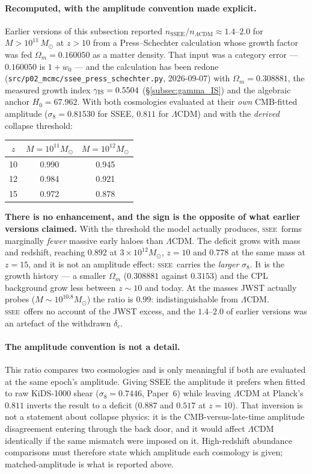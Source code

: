 \documentclass[12pt,a4paper]{article}
\newcommand{\SSEE}{\ifmmode\mathrm{SSEE}\else\textsc{ssee}\fi}
\begin{document}
\paragraph{Recomputed, with the amplitude convention made explicit.}
Earlier versions of this subsection reported
$n_{\mathrm{SSEE}}/n_{\Lambda\mathrm{CDM}}\approx1.4$--$2.0$ for
$M>10^{11}\,M_\odot$ at $z>10$ from a Press--Schechter calculation whose
growth factor was fed $\Omega_m=0.160050$ as a matter density. That input was a
category error --- $0.160050$ is $1+w_0$ --- and the calculation has been
redone (\texttt{src/p02\_mcmc/ssee\_press\_schechter.py}, 2026-09-07) with
$\Omega_m=0.308881$, the measured growth index $\gamma_{\rm IS}=0.5504$
(\S\ref{subsec:gamma_IS}) and the algebraic anchor $H_0=67.962$. With both
cosmologies evaluated at their \emph{own} CMB-fitted amplitude
($\sigma_8=0.81530$ for SSEE, $0.811$ for $\Lambda$CDM) and with the
\emph{derived} collapse threshold:
\begin{center}
\begin{tabular}{ccc}
\toprule
$z$ & $M=10^{11}M_\odot$ & $M=10^{12}M_\odot$ \\
\midrule
10 & 0.990 & 0.945 \\
12 & 0.984 & 0.921 \\
15 & 0.972 & 0.878 \\
\bottomrule
\end{tabular}
\end{center}
\textbf{There is no enhancement, and the sign is the opposite of what earlier
versions claimed.} With the threshold the model actually produces, \SSEE\
forms marginally \emph{fewer} massive early haloes than $\Lambda$CDM. The
deficit grows with mass and redshift, reaching $0.892$ at
$3\times10^{12}M_\odot$, $z=10$ and $0.778$ at the same mass at $z=15$, and it
is not an amplitude effect: \SSEE\ carries the \emph{larger} $\sigma_8$. It is
the growth history --- a smaller $\Omega_m$ ($0.308881$ against $0.3153$) and
the CPL background grow less between $z\sim10$ and today. At the masses JWST
actually probes ($M\sim10^{10.8}M_\odot$) the ratio is $0.99$: indistinguishable
from $\Lambda$CDM. \SSEE\ offers no account of the JWST excess, and the
$1.4$--$2.0$ of earlier versions was an artefact of the withdrawn
$\delta_c$.

\paragraph{The amplitude convention is not a detail.} This ratio compares two
cosmologies and is only meaningful if both are evaluated at the same epoch's
amplitude. Giving SSEE the amplitude it prefers when fitted to raw KiDS-1000
shear ($\sigma_8=0.7446$, Paper~6) while leaving $\Lambda$CDM at Planck's
$0.811$ inverts the result to a deficit ($0.887$ and $0.517$ at $z=10$). That
inversion is not a statement about collapse physics: it is the
CMB-versus-late-time amplitude disagreement entering through the back door,
and it would affect $\Lambda$CDM identically if the same mismatch were imposed
on it. High-redshift abundance comparisons must therefore state which
amplitude each cosmology is given; matched-amplitude is what is reported
above.
\end{document}

